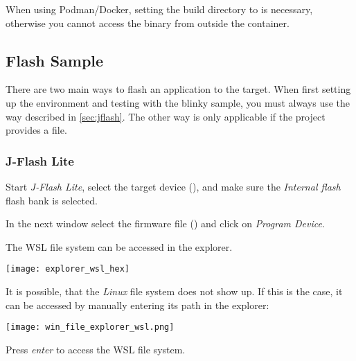 \begin{infobox}
  When using Podman/Docker, setting the build directory to  is necessary, otherwise you cannot access the binary from outside the container.
\end{infobox}


\newpage

\subsection{Flash Sample}

There are two main ways to flash an application to the target.
When first setting up the environment and testing with the blinky sample, you must always use the way described in \autoref{sec:jflash}.
The other way is only applicable if the project provides a  file.

\subsubsection{J-Flash Lite}\label{sec:jflash}
Start \emph{J-Flash Lite}, select the target device (\texttt{\mcu}), and make sure the \emph{Internal flash} flash bank is selected.

\begin{center}
\end{center}

In the next window select the firmware file () and click on \emph{Program Device}.

\begin{infobox}
  The WSL file system can be accessed in the explorer.
  \begin{center}
    \texttt{[image: explorer\_wsl\_hex]}
  \end{center}

  It is possible, that the \emph{Linux} file system does not show up.
  If this is the case, it can be accessed by manually entering its path in the explorer:
  \mono{\\\\wsl\$}
  \begin{center}
    \texttt{[image: win\_file\_explorer\_wsl.png]}
  \end{center}
  Press \emph{enter} to access the WSL file system.
\end{infobox}

